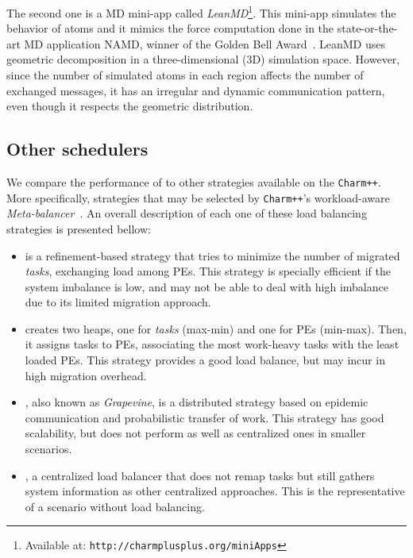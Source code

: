The second one is a MD mini-app called \textit{LeanMD}\footnote{Available at: \texttt{http://charmplusplus.org/miniApps}}.
This mini-app simulates the behavior of atoms and it mimics the force computation done in the state-or-the-art MD application NAMD, winner of the Golden Bell Award~\cite{grapevine}.
LeanMD uses geometric decomposition in a three-dimensional ($3$D) simulation space.
However, since the number of simulated atoms in each region affects the number of exchanged messages, it has an irregular and dynamic communication pattern, even though it respects the geometric distribution.

\subsection{Other schedulers}

We compare the performance of \packdrop to other strategies available on the \texttt{Charm++}.
More specifically, strategies that may be selected by \texttt{Charm++}'s workload-aware \textit{Meta-balancer}~\cite{MenonPHD}.
An overall description of each one of these load balancing strategies is presented bellow:

\begin{itemize}
	\item {} is a refinement-based strategy that tries to minimize the number of migrated \textit{tasks}, exchanging load among PEs.
This strategy is specially efficient if the system imbalance is low, and may not be able to deal with high imbalance due to its limited migration approach.
	\item \greedylb creates two heaps, one for \textit{tasks} (max-min) and one for PEs (min-max). 
Then, it assigns tasks to PEs, associating the most work-heavy tasks with the least loaded PEs.
This strategy provides a good load balance, but may incur in high migration overhead.
    \item \distributedlb, also known as \textit{Grapevine}, is a distributed strategy based on epidemic communication and probabilistic transfer of work.
   This strategy has good scalability, but does not perform as well as centralized ones in smaller scenarios.
   \item \dummylb, a centralized load balancer that does not remap tasks but still gathers system information as other centralized approaches.
   This is the representative of a scenario without load balancing.

\end{itemize}



